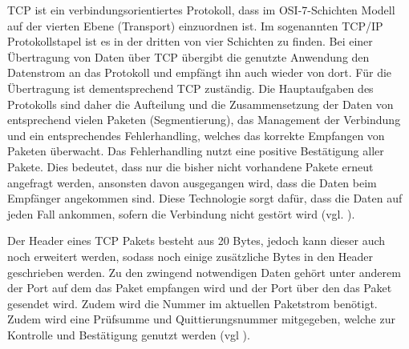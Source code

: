 \ac{TCP} ist ein verbindungsorientiertes Protokoll, dass im \ac{OSI}-7-Schichten Modell auf der vierten Ebene (Transport) einzuordnen ist. Im sogenannten \ac{TCP}/\ac{IP} Protokollstapel ist es in der dritten von vier Schichten zu finden. Bei einer Übertragung von Daten über \ac{TCP} übergibt die genutzte Anwendung den Datenstrom an das Protokoll und empfängt ihn auch wieder von dort. Für die Übertragung ist dementsprechend \ac{TCP} zuständig. 
Die Hauptaufgaben des Protokolls sind daher die Aufteilung und die Zusammensetzung der Daten von entsprechend vielen Paketen (Segmentierung), das Management der Verbindung und ein entsprechendes Fehlerhandling, welches das korrekte Empfangen von Paketen überwacht. Das Fehlerhandling nutzt eine positive Bestätigung aller Pakete. Dies bedeutet, dass nur die bisher nicht vorhandene Pakete erneut angefragt werden, ansonsten davon ausgegangen wird, dass die Daten beim Empfänger angekommen sind. Diese Technologie sorgt dafür, dass die Daten auf jeden Fall ankommen, sofern die Verbindung nicht gestört wird (vgl. \cite{.c}\cite{.22.11.2016}).

Der Header eines \ac{TCP} Pakets besteht aus 20 Bytes, jedoch kann dieser auch noch erweitert werden, sodass noch einige zusätzliche Bytes in den Header geschrieben werden. Zu den zwingend notwendigen Daten gehört unter anderem der Port auf dem das Paket empfangen wird und der Port über den das Paket gesendet wird. Zudem wird die Nummer im aktuellen Paketstrom benötigt. Zudem wird eine Prüfsumme und Quittierungsnummer mitgegeben, welche zur Kontrolle und Bestätigung genutzt werden (vgl \cite{.c}).
